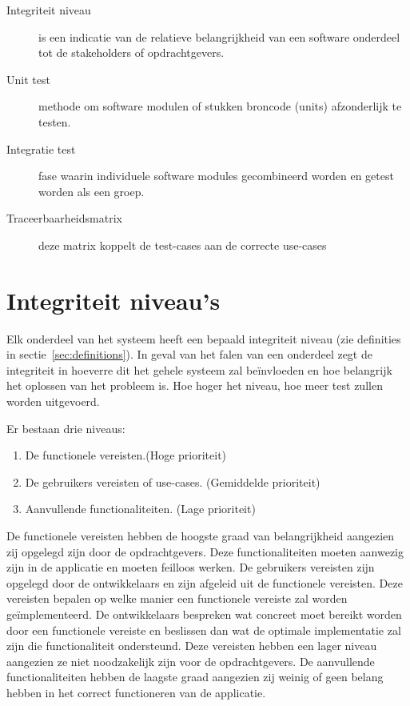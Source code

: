 \documentclass[a4paper]{article}
\begin{document}
\begin{description}

\item[Integriteit niveau] is een indicatie van de relatieve belangrijkheid van een software onderdeel tot de stakeholders of opdrachtgevers.
\item[Unit test] methode om software modulen of stukken broncode (units) afzonderlijk te testen.
\item [Integratie test] fase waarin individuele software modules gecombineerd worden en getest worden als een groep.

\item [Traceerbaarheidsmatrix] deze matrix koppelt de test-cases aan de correcte use-cases

\end{description}

\section{Integriteit niveau's}

Elk onderdeel van het systeem heeft een bepaald integriteit niveau (zie definities in sectie~\ref{sec:definitions}). In geval van het falen van een onderdeel zegt de integriteit in hoeverre dit het gehele systeem zal beïnvloeden en hoe belangrijk het oplossen van het probleem is. Hoe hoger het niveau, hoe meer test zullen worden uitgevoerd.

Er bestaan drie niveaus:

\begin{enumerate}

\item De functionele vereisten.(Hoge prioriteit)

\item De gebruikers vereisten of use-cases. (Gemiddelde prioriteit)

\item Aanvullende functionaliteiten. (Lage prioriteit)

\end{enumerate}

De functionele vereisten hebben de hoogste graad van belangrijkheid aangezien zij opgelegd zijn door de opdrachtgevers. Deze functionaliteiten moeten aanwezig zijn in de applicatie en moeten feilloos werken.
De gebruikers vereisten zijn opgelegd door de ontwikkelaars en zijn afgeleid uit de functionele vereisten. Deze vereisten bepalen op welke manier een functionele vereiste zal worden geïmplementeerd. De ontwikkelaars bespreken wat concreet moet bereikt worden door een functionele vereiste en beslissen dan wat de optimale implementatie zal zijn die functionaliteit ondersteund. Deze vereisten hebben een lager niveau aangezien ze niet noodzakelijk zijn voor de opdrachtgevers.
De aanvullende functionaliteiten hebben de laagste graad aangezien zij weinig of geen belang hebben in het correct functioneren van de applicatie.
\end{document}
